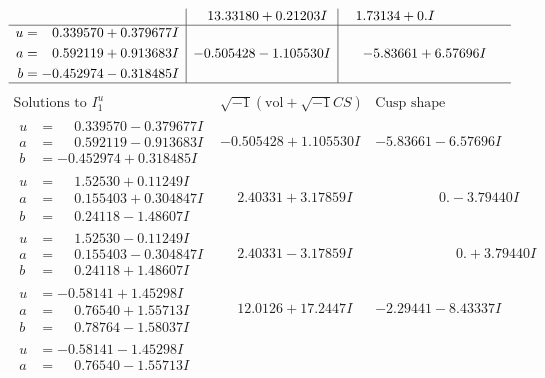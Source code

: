 \documentclass[1p]{elsarticle_modified}
\theoremstyle{definition}
\newcommand{\I}{\sqrt{-1}}
\begin{document}
$$\begin{array}{c|c|c}
 & \phantom{-}13.33180 + 0.21203 I & \phantom{-}1.73134 + 0. I\phantom{ +0.000000I} \\ \hline\begin{aligned}
u &= \phantom{-}0.339570 + 0.379677 I \\
a &= \phantom{-}0.592119 + 0.913683 I \\
b &= -0.452974 - 0.318485 I\end{aligned}
 & -0.505428 - 1.105530 I & -5.83661 + 6.57696 I\\
 \hline 
 \end{array}$$\newpage$$\begin{array}{c|c|c}  
\text{Solutions to }I^u_{1}& \I (\text{vol} + \sqrt{-1}CS) & \text{Cusp shape}\\
 \hline 
\begin{aligned}
u &= \phantom{-}0.339570 - 0.379677 I \\
a &= \phantom{-}0.592119 - 0.913683 I \\
b &= -0.452974 + 0.318485 I\end{aligned}
 & -0.505428 + 1.105530 I & -5.83661 - 6.57696 I \\ \hline\begin{aligned}
u &= \phantom{-}1.52530 + 0.11249 I \\
a &= \phantom{-}0.155403 + 0.304847 I \\
b &= \phantom{-}0.24118 - 1.48607 I\end{aligned}
 & \phantom{-}2.40331 + 3.17859 I & \phantom{-0.000000 } 0. - 3.79440 I \\ \hline\begin{aligned}
u &= \phantom{-}1.52530 - 0.11249 I \\
a &= \phantom{-}0.155403 - 0.304847 I \\
b &= \phantom{-}0.24118 + 1.48607 I\end{aligned}
 & \phantom{-}2.40331 - 3.17859 I & \phantom{-0.000000 -}0. + 3.79440 I \\ \hline\begin{aligned}
u &= -0.58141 + 1.45298 I \\
a &= \phantom{-}0.76540 + 1.55713 I \\
b &= \phantom{-}0.78764 - 1.58037 I\end{aligned}
 & \phantom{-}12.0126 + 17.2447 I & -2.29441 - 8.43337 I \\ \hline\begin{aligned}
u &= -0.58141 - 1.45298 I \\
a &= \phantom{-}0.76540 - 1.55713 I \\

\end{aligned}
\end{array}$$
\end{document}
